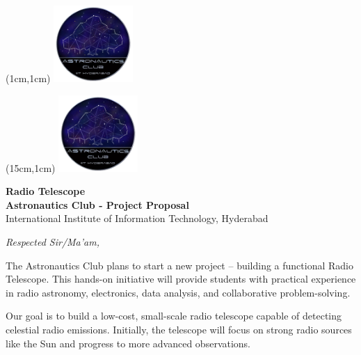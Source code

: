 \documentclass[12pt]{report}
\begin{document}
\begin{titlepage}
    \begin{flushleft}
    \begin{textblock*}{5cm}(1cm,1cm) %
        \includegraphics[width=3cm]{Astro_Club_logo.png} %
    \end{textblock*}
\end{flushleft}

\begin{flushright}
    \begin{textblock*}{5cm}(15cm,1cm) %
        \includegraphics[width=3cm]{Astro_Club_logo.png} %
    \end{textblock*}
\end{flushright}

\centering
\vspace{5em} %
{\huge \textbf{Radio Telescope}}\\[1em]
{\normalsize \textbf{Astronautics Club - Project Proposal}}\\
{\normalsize International Institute of Information Technology, Hyderabad}\\[5em]

\begin{flushleft}
    \textit{Respected Sir/Ma’am,}

    \medskip

    The Astronautics Club plans to start a new project – building a functional Radio Telescope. This hands-on initiative will provide students with practical experience in radio astronomy, electronics, data analysis, and collaborative problem-solving.

    \medskip

    Our goal is to build a low-cost, small-scale radio telescope capable of detecting celestial radio emissions. Initially, the telescope will focus on strong radio sources like the Sun and progress to more advanced observations.


\end{flushleft}
\end{titlepage}
\end{document}
